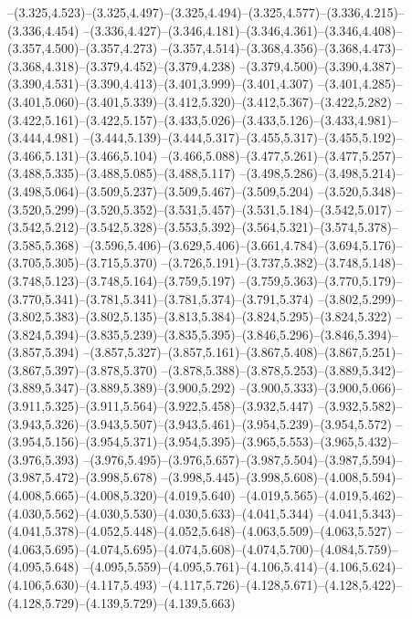  --(3.325,4.523)--(3.325,4.497)--(3.325,4.494)--(3.325,4.577)--(3.336,4.215)--(3.336,4.454)%
  --(3.336,4.427)--(3.346,4.181)--(3.346,4.361)--(3.346,4.408)--(3.357,4.500)--(3.357,4.273)%
  --(3.357,4.514)--(3.368,4.356)--(3.368,4.473)--(3.368,4.318)--(3.379,4.452)--(3.379,4.238)%
  --(3.379,4.500)--(3.390,4.387)--(3.390,4.531)--(3.390,4.413)--(3.401,3.999)--(3.401,4.307)%
  --(3.401,4.285)--(3.401,5.060)--(3.401,5.339)--(3.412,5.320)--(3.412,5.367)--(3.422,5.282)%
  --(3.422,5.161)--(3.422,5.157)--(3.433,5.026)--(3.433,5.126)--(3.433,4.981)--(3.444,4.981)%
  --(3.444,5.139)--(3.444,5.317)--(3.455,5.317)--(3.455,5.192)--(3.466,5.131)--(3.466,5.104)%
  --(3.466,5.088)--(3.477,5.261)--(3.477,5.257)--(3.488,5.335)--(3.488,5.085)--(3.488,5.117)%
  --(3.498,5.286)--(3.498,5.214)--(3.498,5.064)--(3.509,5.237)--(3.509,5.467)--(3.509,5.204)%
  --(3.520,5.348)--(3.520,5.299)--(3.520,5.352)--(3.531,5.457)--(3.531,5.184)--(3.542,5.017)%
  --(3.542,5.212)--(3.542,5.328)--(3.553,5.392)--(3.564,5.321)--(3.574,5.378)--(3.585,5.368)%
  --(3.596,5.406)--(3.629,5.406)--(3.661,4.784)--(3.694,5.176)--(3.705,5.305)--(3.715,5.370)%
  --(3.726,5.191)--(3.737,5.382)--(3.748,5.148)--(3.748,5.123)--(3.748,5.164)--(3.759,5.197)%
  --(3.759,5.363)--(3.770,5.179)--(3.770,5.341)--(3.781,5.341)--(3.781,5.374)--(3.791,5.374)%
  --(3.802,5.299)--(3.802,5.383)--(3.802,5.135)--(3.813,5.384)--(3.824,5.295)--(3.824,5.322)%
  --(3.824,5.394)--(3.835,5.239)--(3.835,5.395)--(3.846,5.296)--(3.846,5.394)--(3.857,5.394)%
  --(3.857,5.327)--(3.857,5.161)--(3.867,5.408)--(3.867,5.251)--(3.867,5.397)--(3.878,5.370)%
  --(3.878,5.388)--(3.878,5.253)--(3.889,5.342)--(3.889,5.347)--(3.889,5.389)--(3.900,5.292)%
  --(3.900,5.333)--(3.900,5.066)--(3.911,5.325)--(3.911,5.564)--(3.922,5.458)--(3.932,5.447)%
  --(3.932,5.582)--(3.943,5.326)--(3.943,5.507)--(3.943,5.461)--(3.954,5.239)--(3.954,5.572)%
  --(3.954,5.156)--(3.954,5.371)--(3.954,5.395)--(3.965,5.553)--(3.965,5.432)--(3.976,5.393)%
  --(3.976,5.495)--(3.976,5.657)--(3.987,5.504)--(3.987,5.594)--(3.987,5.472)--(3.998,5.678)%
  --(3.998,5.445)--(3.998,5.608)--(4.008,5.594)--(4.008,5.665)--(4.008,5.320)--(4.019,5.640)%
  --(4.019,5.565)--(4.019,5.462)--(4.030,5.562)--(4.030,5.530)--(4.030,5.633)--(4.041,5.344)%
  --(4.041,5.343)--(4.041,5.378)--(4.052,5.448)--(4.052,5.648)--(4.063,5.509)--(4.063,5.527)%
  --(4.063,5.695)--(4.074,5.695)--(4.074,5.608)--(4.074,5.700)--(4.084,5.759)--(4.095,5.648)%
  --(4.095,5.559)--(4.095,5.761)--(4.106,5.414)--(4.106,5.624)--(4.106,5.630)--(4.117,5.493)%
  --(4.117,5.726)--(4.128,5.671)--(4.128,5.422)--(4.128,5.729)--(4.139,5.729)--(4.139,5.663)%
